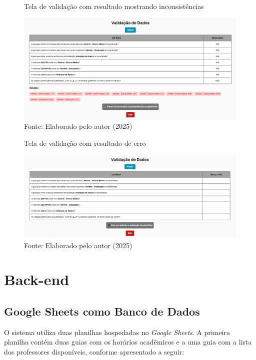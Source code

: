 \begin{itemize}
    \begin{figure}[H]
        \centering
        \caption{Tela de validação com resultado mostrando inconsistências}
        \includegraphics[width=1\textwidth]{Figuras/front-23.png}
        \caption*{Fonte: Elaborado pelo autor (2025)}
        \label{fig_front_23}
    \end{figure}

    \begin{figure}[htb]
        \centering
        \caption{Tela de validação com resultado de erro}
        \includegraphics[width=1\textwidth]{Figuras/front-24.png}
        \caption*{Fonte: Elaborado pelo autor (2025)}
        \label{fig_front_24}
    \end{figure}
\end{itemize}

\section{Back-end}

\subsection{Google Sheets como Banco de Dados}

O sistema utiliza duas planilhas hospedadas no \textit{Google Sheets}. A primeira planilha contém duas guias com os horários acadêmicos e a uma guia com a lista dos professores disponíveis, conforme apresentado a seguir:

